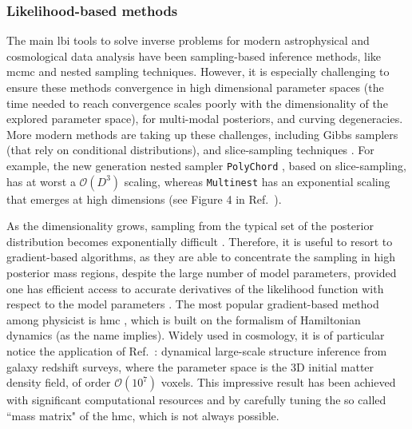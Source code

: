 \subsubsection{Likelihood-based methods}

The main \gls*{lbi} tools to solve inverse problems for modern astrophysical and cosmological data analysis have been sampling-based inference methods, like \gls*{mcmc} \citep{Metropolis:1953am, Hastings:1970aa} and nested sampling \citep{Skilling:2006gxv, Feroz:2008xx, Ashton:2022grj} techniques. However, it is especially challenging to ensure these methods convergence in high dimensional parameter spaces (the time needed to reach convergence scales poorly with the dimensionality of the explored parameter space), for multi-modal posteriors, and curving degeneracies. More modern methods are taking up these challenges, including Gibbs samplers \cite{Smith:1993gibbs} (that rely on conditional distributions), and slice-sampling techniques \cite{Neal:aa, Handley:2015fda}. For example, the new generation nested sampler \texttt{PolyChord} \cite{Handley:2015fda}, based on slice-sampling, has at worst a $\mathcal{O}(D^3)$ scaling, whereas \texttt{Multinest} \cite{Feroz:2008xx} has an exponential scaling that emerges at high dimensions (see Figure 4 in Ref.~\cite{Handley:2015fda}).

As the dimensionality grows, sampling from the typical set of the posterior distribution becomes exponentially difficult \cite{betancourt2017conceptual}. Therefore, it is useful to resort to gradient-based algorithms, as they are able to concentrate the sampling in high posterior mass regions, despite the large number of model parameters, provided one has efficient access to accurate derivatives of the likelihood function with respect to the model parameters \cite{betancourt2017conceptual}. The most popular gradient-based method among physicist is \gls*{hmc} \cite{Duane:1987hmc, neal2012mcmc}, which is built on the formalism of Hamiltonian dynamics (as the name implies). Widely used in cosmology, it is of particular notice the application of Ref.~\cite{Jasche:2012kq}: dynamical large-scale structure inference from galaxy redshift surveys, where the parameter space is the 3D initial matter density field, of order $\mathcal{O}(10^7)$ voxels. This impressive result has been achieved with significant computational resources and by carefully tuning the so called ``mass matrix" of the \gls*{hmc}, which is not always possible. 

